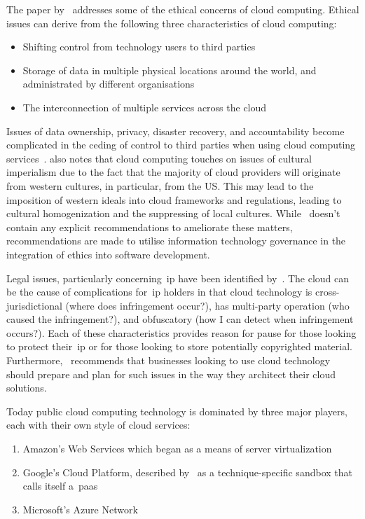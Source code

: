 The paper by~\citet{timmermans2010ethics} addresses some of the ethical concerns of cloud computing.
Ethical issues can derive from the following three characteristics of cloud computing:

\begin{itemize}
    \item Shifting control from technology users to third parties
    \item Storage of data in multiple physical locations around the world, and administrated by different organisations
    \item The interconnection of multiple services across the cloud
\end{itemize}

Issues of data ownership, privacy, disaster recovery,
and accountability become complicated in the ceding of control to third parties when using cloud computing services~\citep{timmermans2010ethics}.
\citet{ess_2008} also notes that cloud computing touches on issues of cultural imperialism due to the fact
that the majority of cloud providers will originate from western cultures, in particular, from the US\@.
This may lead to the imposition of western ideals into cloud frameworks and regulations,
leading to cultural homogenization and the suppressing of local cultures.
While~\citet{timmermans2010ethics} doesn't contain any explicit recommendations to ameliorate these matters,
recommendations are made to utilise information technology governance in the integration of ethics into software development.

Legal issues, particularly concerning~\gls{ip} have been identified by~\citet{roszell_baker_2020}.
The cloud can be the cause of complications for~\gls{ip} holders in that cloud technology is cross-jurisdictional
(where does infringement occur?),
has multi-party operation (who caused the infringement?), and obfuscatory (how I can detect when infringement occurs?).
Each of these characteristics provides reason for pause for those
looking to protect their~\gls{ip} or for those looking to store potentially copyrighted material.
Furthermore,~\citet{roszell_baker_2020} recommends
that businesses looking to use cloud technology should prepare and plan for such issues in the way
they architect their cloud solutions.

Today public cloud computing technology is dominated by three major players, each with their own style of cloud services:

\begin{enumerate}
    \item Amazon's Web Services which began as a means of server virtualization~\citep{awsintro}
    \item Google's Cloud Platform, described by~\citet{cc_overview} as a technique-specific sandbox that calls itself a~\gls{paas}~\citep{googlecloudintro}
    \item Microsoft's Azure Network~\citep{azurefundamentals}
\end{enumerate}

